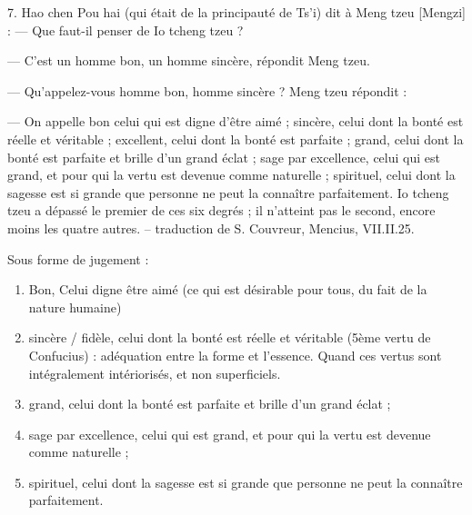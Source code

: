 \begin{singlequote}
    7.	Hao chen Pou hai (qui était de la principauté de Ts’i) dit à Meng tzeu [Mengzi] :
—	Que faut-il penser de Io tcheng tzeu ?

—	C’est un homme bon, un homme sincère, répondit Meng tzeu.

—	Qu’appelez-vous homme bon, homme sincère ? Meng tzeu répondit :

—	On appelle bon celui qui est digne d’être aimé ; sincère, celui dont la bonté est réelle et véritable ; excellent, celui dont la bonté est parfaite ; grand, celui dont la bonté est parfaite et brille d’un grand éclat ; sage par excellence, celui qui est grand, et pour qui la vertu est devenue comme naturelle ; spirituel, celui dont la sagesse est si grande que personne ne peut la  connaître parfaitement. Io tcheng tzeu a dépassé le premier de ces six degrés ; il n’atteint pas le second, encore moins les quatre autres.
-- traduction de S. Couvreur, Mencius, VII.II.25.
\end{singlequote}

Sous forme de jugement : 
\begin{Def}
\begin{enumerate}
    \item Bon, Celui digne être aimé (ce qui est désirable pour tous, du fait de la nature humaine)
    \item sincère / fidèle, celui dont la bonté est réelle et véritable (5ème vertu de Confucius) : adéquation entre la forme et l'essence. Quand ces vertus sont intégralement intériorisés, et non superficiels.   
    \item grand, celui dont la bonté est parfaite et brille d’un grand éclat ; 
    \item sage par excellence, celui qui est grand, et pour qui la vertu est devenue comme naturelle ;    
    \item spirituel, celui dont la sagesse est si grande que personne ne peut la  connaître parfaitement.
\end{enumerate}
 
   
\end{Def}


